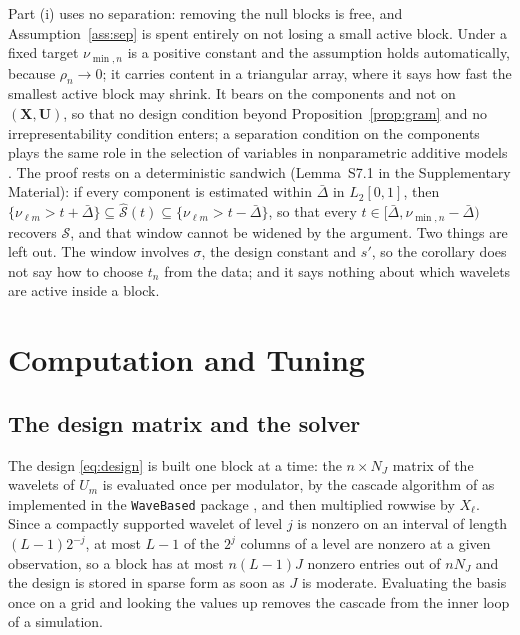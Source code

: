 \documentclass[12pt]{article} %
\theoremstyle{definition}
\newcommand{\cv}{\ell}
\newcommand{\md}{m}
\newcommand{\lev}{j}
\newcommand{\NJ}{N_{J}}
\newcommand{\bX}{\mathbf{X}}
\newcommand{\bU}{\mathbf{U}}
\newcommand{\seff}{s'}
\begin{document}
{Part (i) uses no separation: removing the null blocks is free, and
Assumption~\ref{ass:sep} is spent entirely on not losing a small active block.
Under a fixed target $\nu_{\min,n}$ is a positive constant and the assumption holds
automatically, because $\rho_n \to 0$; it carries content in a triangular
array, where it says how fast the smallest active block may shrink. It bears
on the components and not on $(\bX,\bU)$, so that no design condition beyond
Proposition~\ref{prop:gram} and no irrepresentability condition enters; a
separation condition on the components plays the same role in the selection
of variables in nonparametric additive models \citep{Huang-Horowitz-Wei-2010}.
The proof rests on a deterministic sandwich (Lemma~S7.1 in the Supplementary
Material): if every component is estimated within $\bar{\Delta}$ in $L_2[0,1]$, then
$\{\nu_{\cv\md} > t + \bar{\Delta}\} \subseteq \widehat{\mathcal{S}}(t) \subseteq
\{\nu_{\cv\md} > t - \bar{\Delta}\}$, so that every $t \in [\bar{\Delta}, \nu_{\min,n} - \bar{\Delta})$ recovers $\mathcal{S}$,
and that window cannot be widened by the argument. Two things are left out.
The window involves $\sigma$, the design constant and $\seff$, so the
corollary does not say how to choose $t_n$ from the data; and it says nothing
about which wavelets are active inside a block.
}

\section{Computation and Tuning}
\label{sec:computation}

\subsection{The design matrix and the solver}
\label{sec:solver}

The design \eqref{eq:design} is built one block at a time: the $n \times \NJ$
matrix of the wavelets of $U_{\md}$ is evaluated once per modulator, by the
cascade algorithm of \citet{Daubechies-Lagarias-1991}\textcolor{colR1}{ as implemented in
the \texttt{WaveBased} package \citep{Montoril-WaveBased-2026}}, and then multiplied
rowwise by $X_{\cv}$. Since a compactly supported wavelet of level $\lev$ is
nonzero on an interval of length $(L-1)2^{-\lev}$, at most $L-1$ of the
$2^{\lev}$ columns of a level are nonzero at a given observation, so a block
has at most $n(L-1)J$ nonzero entries out of $n\NJ$ and the design is stored in
sparse form as soon as $J$ is moderate. Evaluating the basis once on a grid and
looking the values up removes the cascade from the inner loop of a
simulation.
\end{document}
